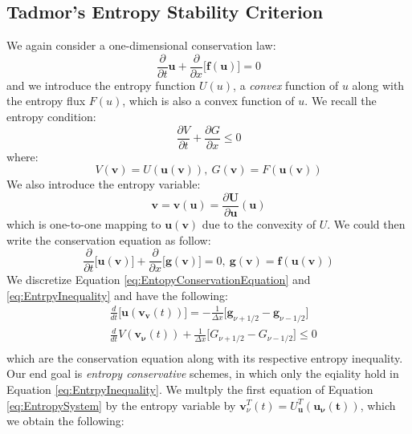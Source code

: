 \documentclass[a4paper]{article}
\numberwithin{equation}{section}
\begin{document}
\subsection{Tadmor's Entropy Stability Criterion}
We again consider a one-dimensional conservation law:
\begin{equation}
    \frac{\partial}{\partial t} \mathbf{u} + \frac{\partial}{\partial x}\big[\mathbf{f(u)}\big] = 0
\end{equation}
and we introduce the entropy function $U(u)$, a \textit{convex} function of $u$ along with the entropy flux $F(u)$, which is also a convex function of $u$. We recall the entropy condition:
\begin{equation}\label{eq:EntrpyInequality}
    \frac{\partial V}{\partial t} + \frac{\partial G}{\partial x} \leq 0
\end{equation}
where:
\begin{equation}
    V(\mathbf{v}) = U(\mathbf{u(v)}), \ G(\mathbf{v}) = F(\mathbf{u(v)})
\end{equation}
We also introduce the entropy variable:
\begin{equation}
    \mathbf{v} = \mathbf{v(u)} = \frac{\partial \mathbf
    U}{\partial \mathbf{u}}(\mathbf{u})
\end{equation}
which is one-to-one mapping to $\mathbf{u}(\mathbf{v})$ due to the convexity of $U$. We could then write the conservation equation as follow:
\begin{equation} \label{eq:EntopyConservationEquation}
    \frac{\partial}{\partial t}\big[\mathbf
    u(\mathbf
    v)\big] + \frac{\partial}{\partial x}\big[\mathbf
    g(\mathbf
    v)\big] = 0, \ \mathbf{g(v)} = \mathbf{f}(\mathbf{u}(\mathbf{
    v}))
\end{equation}
We discretize Equation \ref{eq:EntopyConservationEquation} and \ref{eq:EntrpyInequality} and have the following:
\begin{equation} \label{eq:EntropySystem}
    \begin{split}
        &\frac{d}{dt} \big[\mathbf{u}(\mathbf{v_v}(t))\big] = -\frac{1}{\Delta x}\big[\mathbf
        {g}_{\nu+1/2} - \mathbf{g}_{\nu-1/2}\big]\\
        &\frac{d}{dt} V(\mathbf{v_\nu}(t)) + \frac{1}{\Delta x}\big[G_{\nu + 1/2} - G_{\nu - 1/2}\big] \leq 0 \\
    \end{split}
\end{equation}
which are the conservation equation along with its respective entropy inequality. Our end goal is \textit{entropy conservative} schemes, in which only the eqiality hold in Equation \ref{eq:EntrpyInequality}. We multply the first equation of Equation \ref{eq:EntropySystem} by the entropy variable by $\mathbf{v}_\nu^T(t) = U_\mathbf{u}^T(\mathbf{u_\nu(t)})$, which we obtain the following:
\end{document}
